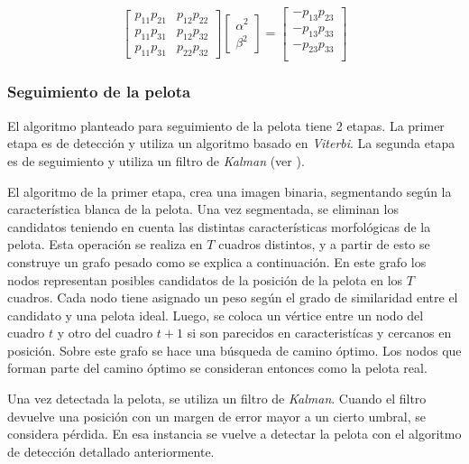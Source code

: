 \begin{equation}
\begin{bmatrix}
    p_{1 1} p_{2 1} & p_{1 2} p_{2 2} \\
    p_{1 1} p_{3 1} & p_{1 2} p_{3 2} \\
    p_{1 1} p_{3 1} & p_{2 2} p_{3 2}
\end{bmatrix}
\begin{bmatrix}
    \alpha^2 \\
    \beta^2
\end{bmatrix}
 =
\begin{bmatrix}
    - p_{1 3} p_{2 3} \\
    - p_{1 3} p_{3 3} \\
    - p_{2 3} p_{3 3} \\
\end{bmatrix}
\end{equation}


\subsubsection*{Seguimiento de la pelota}

El algoritmo planteado para seguimiento de la pelota tiene 2 etapas.
La primer etapa es de detección y utiliza un algoritmo basado en \textit{Viterbi}.
La segunda etapa es de seguimiento y utiliza un filtro de \textit{Kalman} (ver \cite{funk2003study}).

El algoritmo de la primer etapa, crea una imagen binaria, segmentando según la característica blanca de la pelota.
Una vez segmentada, se eliminan los candidatos teniendo en cuenta las distintas características morfológicas de la pelota.
Esta operación se realiza en $T$ cuadros distintos, y a partir de esto se construye un grafo pesado como se explica a continuación.
En este grafo los nodos representan posibles candidatos de la posición de la pelota en los $T$ cuadros.
Cada nodo tiene asignado un peso según el grado de similaridad entre el candidato y una pelota ideal.
Luego, se coloca un vértice entre un nodo del cuadro $t$ y otro del cuadro $t + 1$ si son parecidos en caracteristícas y cercanos en posición.
Sobre este grafo se hace una búsqueda de camino óptimo. Los nodos que forman parte del camino óptimo se consideran entonces
como la pelota real.

Una vez detectada la pelota, se utiliza un filtro de \textit{Kalman}.
Cuando el filtro devuelve una posición con un margen de error mayor a un cierto umbral, se considera pérdida.
En esa instancia se vuelve a detectar la pelota con el algoritmo de detección detallado anteriormente.


